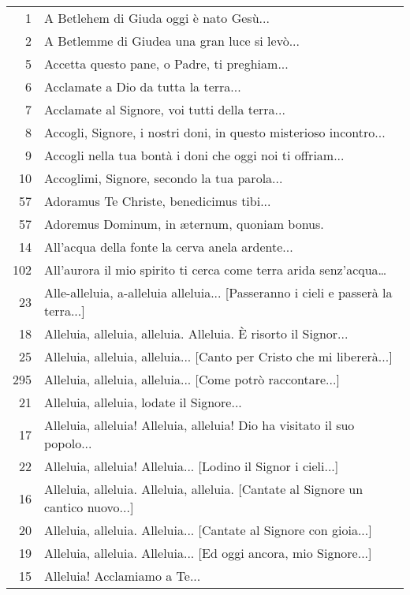
\scriptsize{
\begin{flushleft}
  \begin{longtable}{r m{11cm}}
    1 & A Betlehem di Giuda oggi è nato Gesù...\\
    2 & A Betlemme di Giudea una gran luce si levò...\\
    5 & Accetta questo pane, o Padre, ti preghiam...\\
    6 & Acclamate a Dio da tutta la terra...\\
    7 & Acclamate al Signore, voi tutti della terra...\\
    8 & Accogli, Signore, i nostri doni, in questo misterioso incontro...\\
    9 & Accogli nella tua bontà i doni che oggi noi ti offriam...\\
    10 & Accoglimi, Signore, secondo la tua parola...\\
    57 & Adoramus Te Christe, benedicimus tibi...\\
    57 & Adoremus Dominum, in \ae ternum, quoniam bonus.\\
    14 & All'acqua della fonte la cerva anela ardente...\\
    102 & All'aurora il mio spirito ti cerca  come terra arida senz'acqua…\\
    23 & Alle-alleluia, a-alleluia alleluia... [Passeranno i cieli e passerà la terra...]\\
    18 & Alleluia, alleluia, alleluia. Alleluia. È risorto il Signor...\\
    25 & Alleluia, alleluia, alleluia... [Canto per Cristo che mi libererà...]\\
    295 & Alleluia, alleluia, alleluia... [Come potrò raccontare...]\\
    21 & Alleluia, alleluia, lodate il Signore...\\
    17 & Alleluia, alleluia! Alleluia, alleluia! Dio ha visitato il suo popolo...\\
    22 & Alleluia, alleluia! Alleluia... [Lodino il Signor i cieli...]\\
    16 & Alleluia, alleluia. Alleluia, alleluia. [Cantate al Signore un cantico nuovo...]\\
    20 & Alleluia, alleluia. Alleluia... [Cantate al Signore con gioia...]\\
    19 & Alleluia, alleluia. Alleluia... [Ed oggi ancora, mio Signore...]\\
    15 & Alleluia! Acclamiamo a Te...\\

\end{longtable}
\end{flushleft}}
